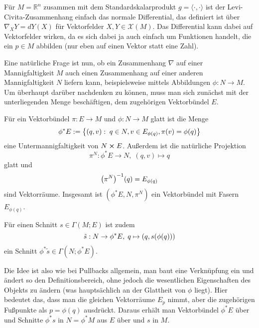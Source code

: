 \begin{bsp}
Für $M = \mathbb{R}^n$ zusammen mit dem Standardskalarprodukt $g = \langle \cdot, \cdot \rangle$ ist der Levi-Civita-Zusammenhang einfach das normale Differential, das definiert ist über $\nabla_X Y = dY(X)$ für Vektorfelder $X, Y \in \mathcal{X}(M)$. Das Differential kann dabei auf Vektorfelder wirken, da es sich dabei ja auch einfach um Funktionen handelt, die ein $p \in M$ abbilden (nur eben auf einen Vektor statt eine Zahl).
\end{bsp}


\iffalse
\begin{bsp}[Zweite Fundamentalform]
machen?
\end{bsp}
\fi


Eine natürliche Frage ist nun, ob ein Zusammenhang $\nabla$ auf einer Mannigfaltigkeit $M$ auch einen Zusammenhang auf einer anderen Mannigfaltigkeit $N$ liefern kann, beispielsweise mittels Abbildungen $\phi: N \rightarrow M$. Um überhaupt darüber nachdenken zu können, muss man sich zunächst mit der unterliegenden Menge beschäftigen, dem zugehörigen Vektorbündel $E$.

\begin{satz}
Für ein Vektorbündel $\pi: E \rightarrow M$ und $\phi: N \rightarrow M$ glatt ist die Menge
\begin{equation}
\phi^* E := \qty{(q, v): \; q \in N, v \in E_{\phi(q)}, \pi(v) = \phi(q)}
\end{equation}
eine Untermannigfaltigkeit von $N \cross E$. Außerdem ist die natürliche Projektion
\begin{equation}
\pi^N: \phi^* E \rightarrow N, \; (q, v) \mapsto q
\end{equation}
glatt und
\begin{equation}
\qty(\pi^N)^{-1}(q) = E_{\phi(q)}
\end{equation}
sind Vektorräume. Insgesamt ist $(\phi^* E, N, \pi^N)$ ein Vektorbündel mit Fasern $E_{\phi(q)}$.

Für einen Schnitt $s \in \Gamma(M; E)$ ist zudem
\begin{equation}
\tilde{s}: N \rightarrow \phi^* E, \; q \mapsto \qty(q, s\qty(\phi(q)))
\end{equation}
ein Schnitt $\phi^* \tilde{s} \in \Gamma(N; \phi^* E)$.
\end{satz}

Die Idee ist also wie bei Pullbacks allgemein, man baut eine Verknüpfung ein und ändert so den Definitionsbereich, ohne jedoch die wesentlichen Eigenschaften des Objekts zu ändern (was hauptsächlich an der Glattheit von $\phi$ liegt). Hier bedeutet das, dass man die gleichen Vektorräume $E_p$ nimmt, aber die zugehörigen Fußpunkte als $p = \phi(q)$ ausdrückt. Daraus erhält man Vektorbündel $\phi^* E$ über und Schnitte $\phi^* s$ in $N = \phi^* M$ aus $E$ über und $s$ in $M$.

